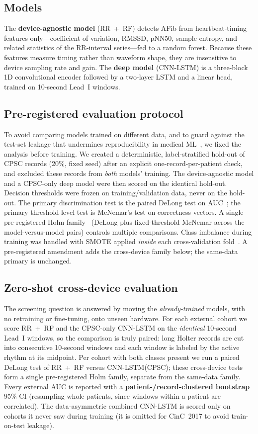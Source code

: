 \subsection{Models}
The \textbf{device-agnostic model} (RR~+~RF) detects AFib from heartbeat-timing
features only---coefficient of variation, RMSSD, pNN50, sample entropy, and
related statistics of the RR-interval series---fed to a random forest. Because
these features measure timing rather than waveform shape, they are insensitive to
device sampling rate and gain. The \textbf{deep model} (CNN-LSTM) is a three-block
1D convolutional encoder followed by a two-layer LSTM and a linear head, trained
on 10-second Lead~I windows.

\subsection{Pre-registered evaluation protocol}
To avoid comparing models trained on different data, and to guard against the
test-set leakage that undermines reproducibility in medical
ML~\cite{kapoor2023leakage}, we fixed the analysis before training. We created a
deterministic, label-stratified hold-out of CPSC records (20\%, fixed seed) after
an explicit one-record-per-patient check, and excluded these records from
\emph{both} models' training. The device-agnostic model and a CPSC-only deep model
were then scored on the identical hold-out. Decision thresholds were frozen on
training/validation data, never on the hold-out. The primary discrimination test
is the paired DeLong test on AUC~\cite{delong1988comparing,sun2014fast}; the
primary threshold-level test is McNemar's test on correctness vectors. A single
pre-registered Holm family~\cite{holm1979simple} (DeLong plus fixed-threshold
McNemar across the model-versus-model pairs) controls multiple comparisons.
Class imbalance during training was handled with SMOTE applied \emph{inside} each
cross-validation fold~\cite{chawla2002smote}. A pre-registered amendment adds the
cross-device family below; the same-data primary is unchanged.

\subsection{Zero-shot cross-device evaluation}
The screening question is answered by moving the \emph{already-trained} models,
with no retraining or fine-tuning, onto unseen hardware. For each external cohort
we score RR~+~RF and the CPSC-only CNN-LSTM on the \emph{identical} 10-second
Lead~I windows, so the comparison is truly paired: long Holter records are cut
into consecutive 10-second windows and each window is labeled by the active rhythm
at its midpoint. Per cohort with both classes present we run a paired DeLong test
of RR~+~RF versus CNN-LSTM(CPSC); these cross-device tests form a single
pre-registered Holm family, separate from the same-data family. Every external AUC
is reported with a \textbf{patient-/record-clustered bootstrap} 95\% CI (resampling
whole patients, since windows within a patient are correlated). The
data-asymmetric combined CNN-LSTM is scored only on cohorts it never saw during
training (it is omitted for CinC~2017 to avoid train-on-test leakage).

